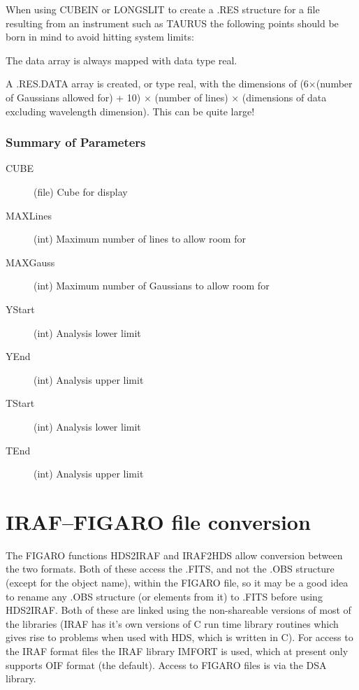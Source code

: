 When using CUBEIN or LONGSLIT to create a .RES structure for a file
resulting from an instrument such as TAURUS the following points should
be born in mind to avoid hitting system limits:
\begin{list}{()}{}
\item The data array is always mapped with data type real.
\item A .RES.DATA array is created, or type real, with the dimensions of
(6$\times$(number of Gaussians allowed for) + 10) $\times$ (number of
lines) $\times$ (dimensions of data excluding wavelength dimension).
This can be quite large!
\end{list}

\subsubsection{Summary of Parameters}

\begin{description}
\item[CUBE] (file) Cube for display
\item[MAXLines] (int) Maximum number of lines to allow room for
\item[MAXGauss] (int) Maximum number of Gaussians to allow room for
\item[YStart] (int) Analysis lower limit
\item[YEnd] (int) Analysis upper limit
\item[TStart] (int) Analysis lower limit
\item[TEnd] (int) Analysis upper limit
\end{description}

\section{IRAF--FIGARO file conversion}

The FIGARO functions HDS2IRAF and IRAF2HDS allow conversion between
the two formats. Both of these access the .FITS, and not the .OBS
structure (except for the object name), within the FIGARO file, so it
may be a good idea to rename any .OBS structure (or elements from it) to
.FITS before using HDS2IRAF. Both of these are linked using the
non-shareable versions of most of the libraries (IRAF has it's own
versions of C run time library routines which gives rise to problems
when used with HDS, which is written in C). For access to the IRAF
format files the IRAF library IMFORT is used, which at present only
supports OIF format (the default).
Access to FIGARO files is via the DSA library.

